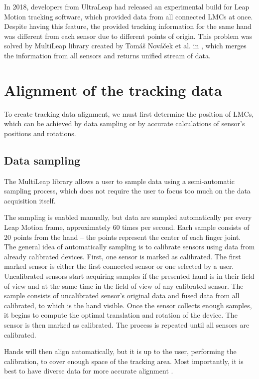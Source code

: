 
In 2018, developers from UltraLeap had released an experimental build for Leap Motion tracking software, which provided data from all connected LMCs at once. Despite having this feature, the provided tracking information for the same hand was different from each sensor due to different points of origin. This problem was solved by MultiLeap library created by Tomáš Nováček et al. in \cite{tomasMultileap}, which merges the information from all sensors and returns unified stream of data. 

\section{Alignment of the tracking data}

To create tracking data alignment, we must first determine the position of LMCs, which can be achieved by data sampling or by accurate calculations of sensor's positions and rotations.

\subsection{Data sampling}

The MultiLeap library allows a user to sample data using a semi-automatic sampling process, which does not require the user to focus too much on the data acquisition itself.

The sampling is enabled manually, but data are sampled automatically per every Leap Motion frame, approximately 60 times per second. Each sample consists of 20 points from the hand – the points represent the center of each finger joint. 
The general idea of automatically sampling is to calibrate sensors using data from already calibrated devices. First, one sensor is marked as calibrated. The first marked sensor is either the first connected sensor or one selected by a user. Uncalibrated sensors start acquiring samples if the presented hand is in their field of view and at the same time in the field of view of any calibrated sensor. The sample consists of uncalibrated sensor's original data and fused data from all calibrated, to which is the hand visible. Once the sensor collects enough samples, it begins to compute the optimal translation and rotation of the device. The sensor is then marked as calibrated. The process is repeated until all sensors are calibrated.


Hands will then align automatically, but it is up to the user, performing the calibration, to cover enough space of the tracking area. Most importantly, it is best to have diverse data for more accurate alignment \cite{tomasMultileap}.

